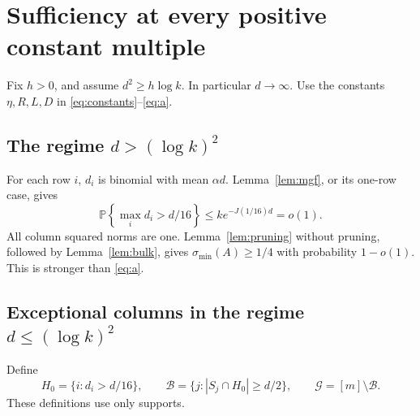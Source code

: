 \documentclass[11pt]{article}
\theoremstyle{definition}
\theoremstyle{remark}
\newcommand{\PP}{\mathbb P}
\newcommand{\smin}{\sigma_{\min}}
\newcommand{\abs}[1]{\left\lvert #1\right\rvert}
\newcommand{\calB}{\mathcal B}
\newcommand{\calG}{\mathcal G}
\begin{document}
\section{Sufficiency at every positive constant multiple}\label{sec:suff}

Fix $h>0$, and assume $d^2\geq h\log k$. In particular $d\to\infty$. Use the constants $\eta,R,L,D$ in \eqref{eq:constants}--\eqref{eq:a}.

\subsection{The regime \texorpdfstring{$d>(\log k)^2$}{d > (log k) squared}}

For each row $i$, $d_i$ is binomial with mean $\alpha d$. Lemma~\ref{lem:mgf}, or its one-row case, gives
\[
 \PP\left\{\max_i d_i>d/16\right\}
 \leq k e^{-J(1/16)d}=o(1).
\]
All column squared norms are one. Lemma~\ref{lem:pruning} without pruning, followed by Lemma~\ref{lem:bulk}, gives $\smin(A)\geq1/4$ with probability $1-o(1)$. This is stronger than \eqref{eq:a}.

\subsection{Exceptional columns in the regime \texorpdfstring{$d\leq(\log k)^2$}{d <= (log k) squared}}

Define
\begin{equation}\label{eq:bad}
 H_0=\{i:d_i>d/16\},\qquad
 \calB=\{j:\abs{S_j\cap H_0}\geq d/2\},\qquad
 \calG=[m]\setminus\calB.
\end{equation}
These definitions use only supports.
\end{document}
